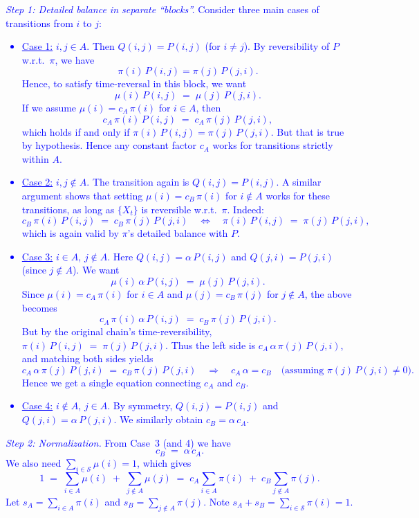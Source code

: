 \documentclass{article}
\begin{document}
\begin{itemize}
    \textcolor{blue}{\emph{Step 1: Detailed balance in separate ``blocks''.} 
Consider three main cases of transitions from $i$ to $j$:
\begin{itemize}
\item \underline{Case 1:} $i,j \in A$. Then $Q(i,j) = P(i,j)$ (for $i\neq j$). By reversibility of $P$ w.r.t.\ $\pi$, we have
\[
  \pi(i)\,P(i,j) = \pi(j)\,P(j,i).
\]
Hence, to satisfy time-reversal in this block, we want 
\[
  \mu(i)\,P(i,j)\;=\;\mu(j)\,P(j,i).
\]
If we assume $\mu(i)=c_A\,\pi(i)$ for $i\in A$, then
\[
  c_A\,\pi(i)\,P(i,j) 
  \;=\;
  c_A\,\pi(j)\,P(j,i),
\]
which holds if and only if $\pi(i)\,P(i,j)=\pi(j)\,P(j,i)$. 
But that is true by hypothesis. 
Hence any constant factor $c_A$ works for transitions strictly within $A$.
\item \underline{Case 2:} $i,j \notin A$. The transition again is $Q(i,j)=P(i,j)$. 
A similar argument shows that setting $\mu(i) = c_B\,\pi(i)$ for $i\notin A$ works for these transitions, as long as $\{X_t\}$ is reversible w.r.t.\ $\pi$. 
Indeed:
\[
  c_B\,\pi(i)\,P(i,j)\;=\;c_B\,\pi(j)\,P(j,i)
  \quad\Longleftrightarrow\quad
  \pi(i)\,P(i,j)\;=\;\pi(j)\,P(j,i),
\]
which is again valid by $\pi$'s detailed balance with $P$.
\item \underline{Case 3:} $i\in A$, $j\notin A$. Here $Q(i,j)=\alpha\,P(i,j)$ and $Q(j,i)=P(j,i)$ (since $j\notin A$). 
We want
\[
  \mu(i)\,\alpha\,P(i,j)\;=\;\mu(j)\,P(j,i).
\]
Since $\mu(i)=c_A\,\pi(i)$ for $i\in A$ and $\mu(j)=c_B\,\pi(j)$ for $j\notin A$, the above becomes
\[
  c_A\,\pi(i)\,\alpha\,P(i,j) 
  \;=\;
  c_B\,\pi(j)\,P(j,i).
\]
But by the original chain's time-reversibility, 
\(
  \pi(i)\,P(i,j) \;=\; \pi(j)\,P(j,i).
\)
Thus the left side is $c_A\,\alpha\,\pi(j)\,P(j,i)$, and matching both sides yields
\[
  c_A\,\alpha\,\pi(j)\,P(j,i)
  \;=\;
  c_B\,\pi(j)\,P(j,i)
  \quad\Longrightarrow\quad
  c_A\,\alpha = c_B
  \quad
  \bigl(\text{assuming } \pi(j)\,P(j,i)\neq 0\bigr).
\]
Hence we get a single equation connecting $c_A$ and $c_B$.
\item \underline{Case 4:} $i\notin A$, $j\in A$. By symmetry, $Q(i,j)=P(i,j)$ and $Q(j,i)=\alpha\,P(j,i)$. 
We similarly obtain $c_B = \alpha\,c_A$. 
\end{itemize}
\medskip
\noindent
\emph{Step 2: Normalization.} 
From Case~3 (and 4) we have 
\[
  c_B \;=\;\alpha\,c_A.
\]
We also need $\sum_{i\in \mathcal{S}} \mu(i)=1$, which gives
\[
  1 
  \;=\;
  \sum_{i\in A}\mu(i)\;+\;\sum_{j\notin A}\mu(j)
  \;=\;
  c_A \sum_{i\in A}\pi(i)\;+\;
  c_B \sum_{j\notin A}\pi(j).
\]
Let $s_A=\sum_{i\in A}\pi(i)$ and $s_B=\sum_{j\notin A}\pi(j)$. Note $s_A + s_B = \sum_{i\in \mathcal{S}} \pi(i) = 1$. 
}
\end{itemize}
\end{document}
